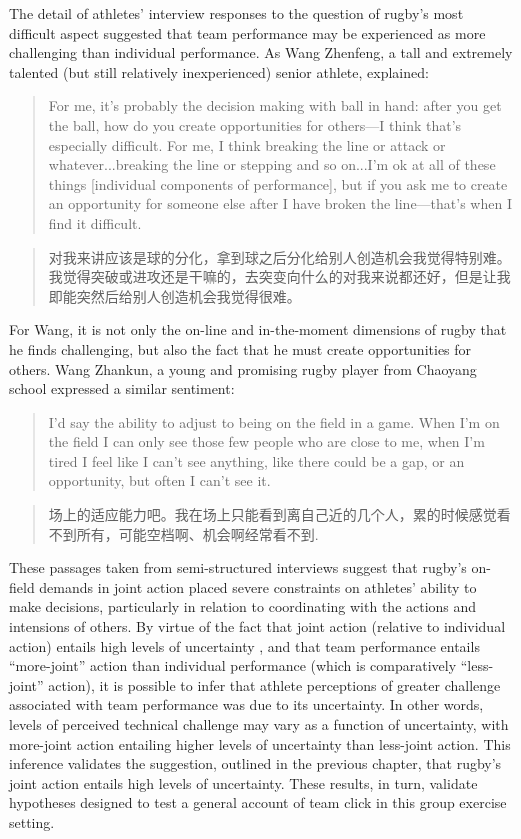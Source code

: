 \begin{CJK}{UTF8}{gbsn}
The detail of athletes' interview responses to the question of rugby's most difficult aspect suggested that team performance may be experienced as more challenging than individual performance.  As Wang Zhenfeng, a tall and extremely talented (but still relatively inexperienced) senior athlete, explained:
            \begin{quote}
            For me, it's probably the decision making with ball in hand: after you get the ball, how do you create opportunities for others---I think that's especially difficult.  For me, I think breaking the line or attack or whatever...breaking the line or stepping and so on...I'm ok at all of these things [individual components of performance], but if you ask me to create an opportunity for someone else after I have broken the line---that's when I find it difficult.
            \end{quote}
            \begin{quote}
            对我来讲应该是球的分化，拿到球之后分化给别人创造机会我觉得特别难。我觉得突破或进攻还是干嘛的，去突变向什么的对我来说都还好，但是让我即能突然后给别人创造机会我觉得很难。
            \end{quote}
For Wang, it is not only the on-line and in-the-moment dimensions of rugby that he finds challenging, but also the fact that he must create opportunities for others.  Wang Zhankun, a young and promising rugby player from Chaoyang school expressed a similar sentiment:
          \begin{quote}
          I'd say the ability to adjust to being on the field in a game.  When I'm on the field I can only see those few people who are close to me, when I'm tired I feel like I can't see anything, like there could be a gap, or an opportunity, but often I can't see it.
          \end{quote}
          \begin{quote}
          场上的适应能力吧。我在场上只能看到离自己近的几个人，累的时候感觉看不到所有，可能空档啊、机会啊经常看不到.
          \end{quote}

These passages taken from semi-structured interviews suggest that rugby's on-field demands in joint action placed severe constraints on athletes' ability to make decisions, particularly in relation to coordinating with the actions and intensions of others.  By virtue of the fact that joint action (relative to individual action) entails high levels of uncertainty \citep{Turvey1978}, and that team performance entails ``more-joint'' action than individual performance (which is comparatively ``less-joint'' action), it is possible to infer that athlete perceptions of greater challenge associated with team performance was due to its uncertainty.  In other words, levels of perceived technical challenge may vary as a function of uncertainty, with more-joint action entailing higher levels of uncertainty than less-joint action.  This inference validates the suggestion, outlined in the previous chapter, that rugby's joint action entails high levels of uncertainty.  These results, in turn, validate hypotheses designed to test a general account of team click in this group exercise setting.


\end{CJK}
